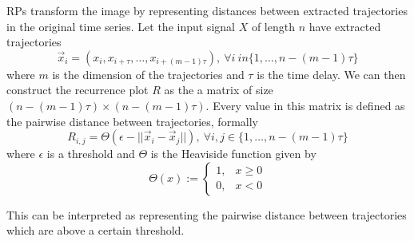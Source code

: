 RPs \cite{eckmann1995recurrence} transform the image by representing distances between extracted trajectories in the original time series.
Let the input signal $X$ of length $n$ have extracted trajectories
\begin{equation}
	\vec{x}_i = \left(x_i, x_{i+\tau},\ldots, x_{i+(m-1)\tau}\right), ~ \forall i \ in \{1,\ldots,n-(m-1)\tau\}
\end{equation}
where $m$ is the dimension of the trajectories and $\tau$ is the time delay.
We can then construct the recurrence plot $R$ as the a matrix of size $\left(n - (m-1)\tau\right) \times \left(n - (m-1)\tau\right)$.
Every value in this matrix is defined as the pairwise distance between trajectories, formally
\begin{equation}
	R_{i,j} = \Theta\left(\epsilon - ||\vec{x}_i - \vec{x}_j|| \right),~\forall i,j \in \{1, \ldots, n-(m-1)\tau\}
\end{equation}
where $\epsilon$ is a threshold and $\Theta$ is the Heaviside function given by
\begin{equation}
	\Theta(x) := \begin{cases}
		1, & x \geq 0\\
		0, & x < 0
	\end{cases}
\end{equation}

This can be interpreted as representing the pairwise distance between trajectories which are above a certain threshold.
